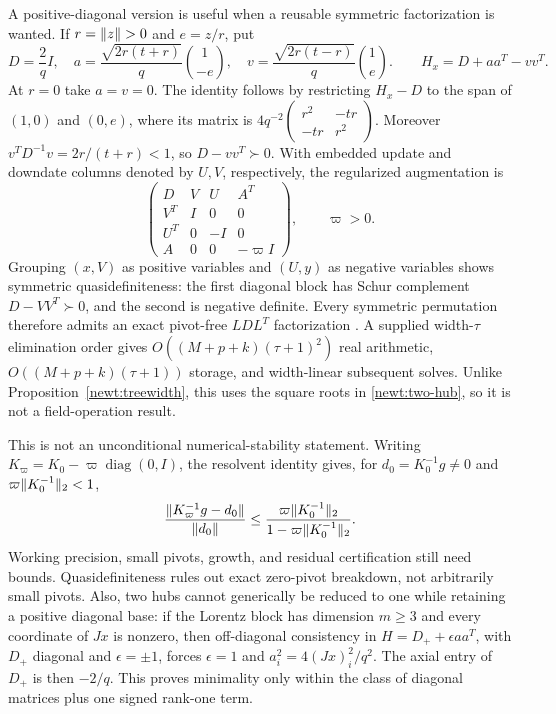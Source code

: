 A positive-diagonal version is useful when a reusable symmetric
factorization is wanted.  If $r=\lVert z\rVert>0$ and $e=z/r$, put
\begin{equation}\label{newt:two-hub}
 D=\frac2q I,\quad
 a=\frac{\sqrt{2r(t+r)}}q\binom1{-e},\quad
 v=\frac{\sqrt{2r(t-r)}}q\binom1e.
 \qquad H_x=D+aa^T-vv^T.
\end{equation}
At $r=0$ take $a=v=0$.  The identity follows by restricting $H_x-D$
to the span of $(1,0)$ and $(0,e)$, where its matrix is
$4q^{-2}\left(\begin{smallmatrix}r^2&-tr\\-tr&r^2\end{smallmatrix}\right)$.
Moreover $v^TD^{-1}v=2r/(t+r)<1$, so $D-vv^T\succ0$.
With embedded update and downdate columns denoted by $U,V$, respectively,
the regularized augmentation is
\begin{equation}\label{newt:quasidefinite}
 \begin{pmatrix}
 D&V&U&A^T\\V^T&I&0&0\\U^T&0&-I&0\\A&0&0&-\varpi I
 \end{pmatrix},\qquad \varpi>0.
\end{equation}
Grouping $(x,V)$ as positive variables and $(U,y)$ as negative variables
shows symmetric quasidefiniteness: the first diagonal block has Schur
complement $D-VV^T\succ0$, and the second is negative definite.
Every symmetric permutation therefore admits an exact pivot-free
$LDL^T$ factorization \citep{Vanderbei1995}.  A supplied width-$\tau$
elimination order gives $O((M+p+k)(\tau+1)^2)$ real arithmetic,
$O((M+p+k)(\tau+1))$ storage, and width-linear subsequent solves.
Unlike Proposition~\ref{newt:treewidth}, this uses the square roots in
\eqref{newt:two-hub}, so it is not a field-operation result.

This is not an unconditional numerical-stability statement.
Writing $K_\varpi=K_0-\varpi\operatorname{diag}(0,I)$, the resolvent
identity gives, for $d_0=K_0^{-1}g\ne0$ and
$\varpi\lVert K_0^{-1}\rVert_2<1$,
\begin{equation}\label{newt:regularization-error}
 \frac{\lVert K_\varpi^{-1}g-d_0\rVert}{\lVert d_0\rVert}
 \leq\frac{\varpi\lVert K_0^{-1}\rVert_2}
              {1-\varpi\lVert K_0^{-1}\rVert_2}.
\end{equation}
Working precision, small pivots, growth, and residual certification still
need bounds.  Quasidefiniteness rules out exact zero-pivot breakdown, not
arbitrarily small pivots.  Also, two hubs cannot generically be reduced to
one while retaining a positive diagonal base: if the Lorentz block has
dimension $m\geq3$ and every coordinate of $Jx$ is nonzero, then
off-diagonal consistency in $H=D_++\epsilon aa^T$, with $D_+$ diagonal
and $\epsilon=\pm1$, forces $\epsilon=1$ and $a_i^2=4(Jx)_i^2/q^2$.
The axial entry of $D_+$ is then $-2/q$.  This proves minimality only
within the class of diagonal matrices plus one signed rank-one term.

